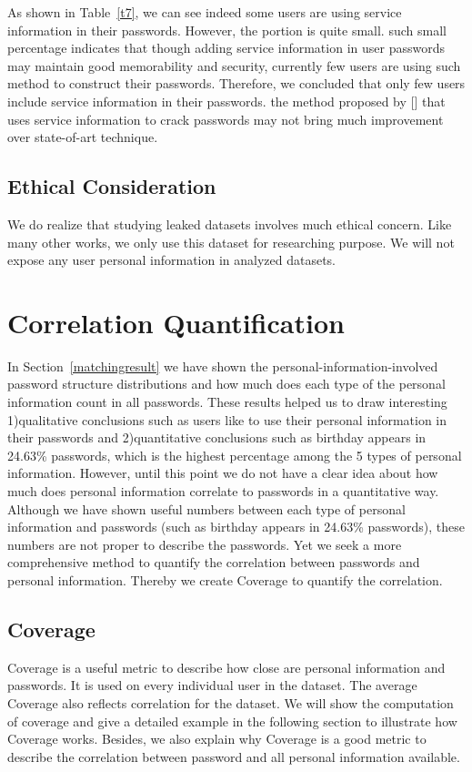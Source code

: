 \documentclass{sig-alternate}
\begin{document}
As shown in Table~\ref{t7}, we can see indeed some users are using service information in their passwords. However, the portion is quite small. such small percentage indicates that though adding service information in user passwords may maintain good memorability and security, currently few users are using such method to construct their passwords. Therefore, we concluded that only few users include service information in their passwords. the method proposed by [] that uses service information to crack passwords may not bring much improvement over state-of-art technique.


\subsection{Ethical Consideration}
We do realize that studying leaked datasets involves much ethical concern. Like many other works, we only use this dataset for researching purpose. We will not expose any user personal information in analyzed datasets.
\section{Correlation Quantification}
\label{correlationquantification}
In Section~\ref{matchingresult} we have shown the personal-information-involved password structure distributions and how much does each type of the personal information count in all passwords. These results helped us to draw interesting 1)qualitative conclusions such as users like to use their personal information in their passwords and 2)quantitative conclusions such as birthday appears in 24.63\% passwords, which is the highest percentage among the 5 types of personal information.
However, until this point we do not have a clear idea about how much does personal information correlate to passwords in a quantitative way. Although we have shown useful numbers between each type of personal information and passwords (such as birthday appears in 24.63\% passwords), these numbers are not proper to describe the passwords. 
Yet we seek a more comprehensive method to quantify the correlation between passwords and personal information. Thereby we create Coverage to quantify the correlation. 

\subsection{Coverage}
\label{coverage}

Coverage is a useful metric to describe how close are personal information and passwords. It is used on every individual user in the dataset. The average Coverage also reflects correlation for the dataset. We will show the computation of coverage and give a detailed example in the following section to illustrate how Coverage works. Besides, we also explain why Coverage is a good metric to describe the correlation between password and all personal information available. 
\end{document}
